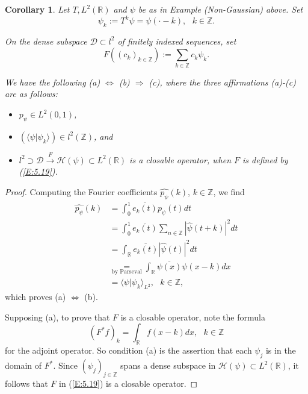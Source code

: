 \documentclass{birkmult}
\newtheorem{cor}[thm]{Corollary}
\theoremstyle{definition}
\theoremstyle{remark}
\numberwithin{equation}{section}
\begin{document}
\begin{cor}
\label{C:5.6a}
Let $T, L^{2}(\mathbb{R})$ and $\psi$ be as in Example (Non-Gaussian) above. 
Set
\begin{equation}
\label{E:5.18}
  \psi_{k} := T^{k}\psi = \psi(\cdot -k), \text{ } k \in \mathbb{Z}.
\end{equation}

On the dense subspace $\mathcal{D} \subset l^{2}$ of finitely indexed 
sequences, set
\begin{equation}
\label{E:5.19}
  F((c_{k})_{k \in \mathbb{Z}}):= \sum_{k \in \mathbb{Z}}c_{k}\psi_{k}.
\end{equation}

We have the following (a) $\Longleftrightarrow$ (b) $\Longrightarrow$ (c), 
where the three affirmations (a)-(c) are as follows:
\begin{itemize}
  \item[(a)] $p_{\psi} \in L^{2}(0,1)$,
  \item[(b)] $(\langle \psi | \psi_{k} \rangle) \in l^{2}(\mathbb{Z})$,
  and
  \item[(c)] $l^{2} \supset \mathcal{D} \overset{F}{\longrightarrow}
  \mathcal{H}(\psi) \subset L^{2}(\mathbb{R})$ is a closable operator, when 
  $F$ is defined by (\ref{E:5.19}).
\end{itemize}
\end{cor}
\begin{proof}
Computing the Fourier coefficients $\widehat{p_{\psi}}(k)$, $k \in \mathbb{Z}$, 
we find 
\begin{align*}
  \widehat{p_{\psi}}(k) &= \int_{0}^{1}\overline{e_{k}(t)}p_{\psi}(t)dt \\
  &= \int_{0}^{1}\overline{e_{k}(t)}\sum_{n \in \mathbb{Z}}|\widehat{\psi}(t+k)|^{2}dt \\
  &= \int_{\mathbb{R}}\overline{e_{k}(t)}|\widehat{\psi}(t)|^{2}dt \\
  &\underset{\text{by Parseval}}{=} \int_{\mathbb{R}}\overline{\psi(x)}
  \psi(x-k)dx  \\
  &= \langle \psi | \psi_{k} \rangle_{L^{2}}, \text{ } k \in \mathbb{Z}, 
\end{align*}
which proves (a) $\Longleftrightarrow$ (b).

Supposing (a), to prove that $F$ is a closable operator, note the formula 
\[
  (F^{*}f)_{k}=\int_{\mathbb{R}}f(x-k)dx, \text{ } k\in \mathbb{Z}
\]
for the adjoint operator.  So condition (a) is the assertion that each 
$\psi_{j}$ is in the domain of $F^{*}$.  Since 
$(\psi_{j})_{j \in \mathbb{Z}}$ spans a dense subspace in 
$\mathcal{H}(\psi) \subset L^{2}(\mathbb{R})$, it follows that $F$ in 
(\ref{E:5.19}) is a closable operator.
\end{proof}
\end{document}
